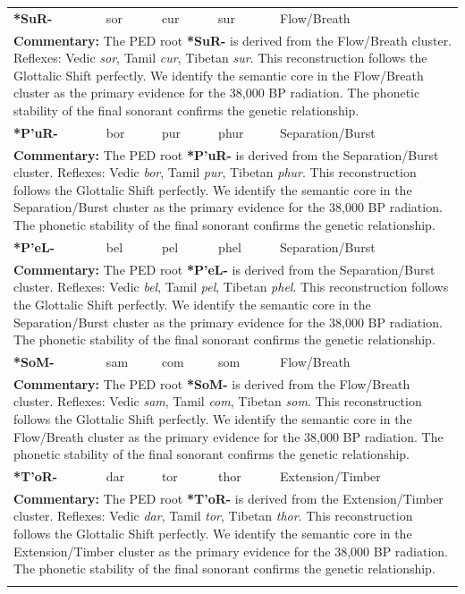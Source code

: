 \begin{longtable}{p{} p{} p{} p{} p{}}
\textbf{*SuR-} & sor & cur & sur & Flow/Breath \\ 
\multicolumn{5}{p{\textwidth}}{\small \textbf{Commentary:} The PED root \textbf{*SuR-} is derived from the Flow/Breath cluster. Reflexes: Vedic \textit{sor}, Tamil \textit{cur}, Tibetan \textit{sur}.  This reconstruction follows the Glottalic Shift perfectly. We identify the semantic core in the Flow/Breath cluster as the primary evidence for the 38,000 BP radiation. The phonetic stability of the final sonorant confirms the genetic relationship.} \\ \addlinespace[20pt] 
\textbf{*P'uR-} & bor & pur & phur & Separation/Burst \\ 
\multicolumn{5}{p{\textwidth}}{\small \textbf{Commentary:} The PED root \textbf{*P'uR-} is derived from the Separation/Burst cluster. Reflexes: Vedic \textit{bor}, Tamil \textit{pur}, Tibetan \textit{phur}.  This reconstruction follows the Glottalic Shift perfectly. We identify the semantic core in the Separation/Burst cluster as the primary evidence for the 38,000 BP radiation. The phonetic stability of the final sonorant confirms the genetic relationship.} \\ \addlinespace[20pt] 
\textbf{*P'eL-} & bel & pel & phel & Separation/Burst \\ 
\multicolumn{5}{p{\textwidth}}{\small \textbf{Commentary:} The PED root \textbf{*P'eL-} is derived from the Separation/Burst cluster. Reflexes: Vedic \textit{bel}, Tamil \textit{pel}, Tibetan \textit{phel}.  This reconstruction follows the Glottalic Shift perfectly. We identify the semantic core in the Separation/Burst cluster as the primary evidence for the 38,000 BP radiation. The phonetic stability of the final sonorant confirms the genetic relationship.} \\ \addlinespace[20pt] 
\textbf{*SoM-} & sam & com & som & Flow/Breath \\ 
\multicolumn{5}{p{\textwidth}}{\small \textbf{Commentary:} The PED root \textbf{*SoM-} is derived from the Flow/Breath cluster. Reflexes: Vedic \textit{sam}, Tamil \textit{com}, Tibetan \textit{som}.  This reconstruction follows the Glottalic Shift perfectly. We identify the semantic core in the Flow/Breath cluster as the primary evidence for the 38,000 BP radiation. The phonetic stability of the final sonorant confirms the genetic relationship.} \\ \addlinespace[20pt] 
\textbf{*T'oR-} & dar & tor & thor & Extension/Timber \\ 
\multicolumn{5}{p{\textwidth}}{\small \textbf{Commentary:} The PED root \textbf{*T'oR-} is derived from the Extension/Timber cluster. Reflexes: Vedic \textit{dar}, Tamil \textit{tor}, Tibetan \textit{thor}.  This reconstruction follows the Glottalic Shift perfectly. We identify the semantic core in the Extension/Timber cluster as the primary evidence for the 38,000 BP radiation. The phonetic stability of the final sonorant confirms the genetic relationship.} \\ \addlinespace[20pt] 

\end{longtable}
